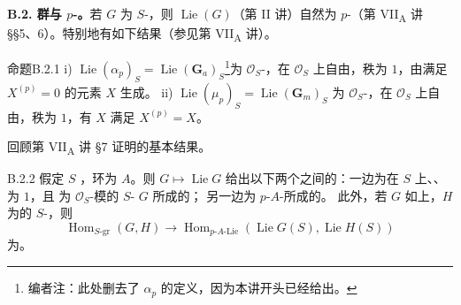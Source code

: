 \textbf{B.2. 群与 $p$-。}若 $G$ 为 $S$-，则 $\operatorname{Lie}(G)$（第 II 讲）自然为 $p$-（第 VII\textsubscript{A} 讲 §§5、6）。特别地有如下结果（参见第 VII\textsubscript{A} 讲）。
\begin{SGAresult}{命题}{B.2.1}
i) $\operatorname{Lie}(\alpha_p)_S=\operatorname{Lie}(\mathbf G_a)_S$\footnote{编者注：此处删去了 $\alpha_p$ 的定义，因为本讲开头已经给出。}为 $\mathscr O_S$-，在 $\mathscr O_S$ 上自由，秩为 $1$，由满足 $X^{(p)}=0$ 的元素 $X$ 生成。
ii) $\operatorname{Lie}(\mu_p)_S=\operatorname{Lie}(\mathbf G_m)_S$ 为 $\mathscr O_S$-，在 $\mathscr O_S$ 上自由，秩为 $1$，有 $X$ 满足 $X^{(p)}=X$。
\end{SGAresult}
回顾第 VII\textsubscript{A} 讲 §7 证明的基本结果。
\begin{SGAresult}{}{B.2.2}
假定 $S$ ，环为 $A$。则 $G\mapsto\operatorname{Lie}G$ 给出以下两个之间的：一边为在 $S$ 上、、为 $1$，且 为 $\mathscr O_S$-模的 $S$- $G$ 所成的；
另一边为 $p$-$A$-所成的。
此外，若 $G$ 如上，$H$ 为的 $S$-，则
\[\operatorname{Hom}_{S\text{-gr}}(G,H)\longrightarrow
\operatorname{Hom}_{p\text{-}A\text{-Lie}}(\operatorname{Lie}G(S),\operatorname{Lie}H(S))\]
为。
\end{SGAresult}

